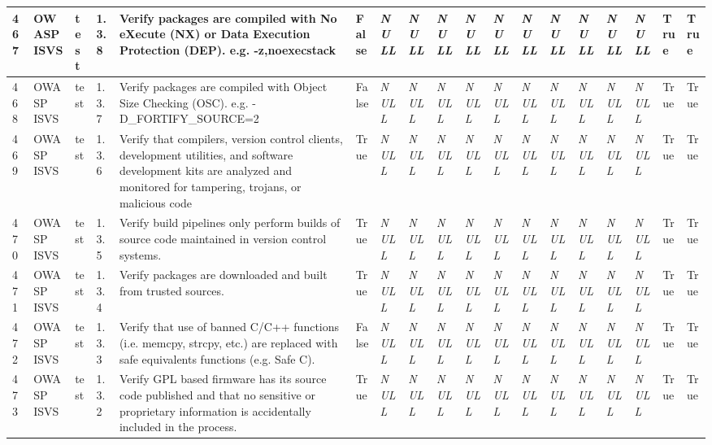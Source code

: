 \begin{longtable}{|l|l|l|l|l|l|l|l|l|l|l|l|l|l|l|l|l|l|}
467 & OWASP ISVS & test & 1.3.8 & Verify packages are compiled with No eXecute (NX) or Data Execution Protection (DEP). e.g. -z,noexecstack & False & \textit{NULL} & \textit{NULL} & \textit{NULL} & \textit{NULL} & \textit{NULL} & \textit{NULL} & \textit{NULL} & \textit{NULL} & \textit{NULL} & \textit{NULL} & True & True \\ \hline 
468 & OWASP ISVS & test & 1.3.7 & Verify packages are compiled with Object Size Checking (OSC). e.g. -D\_FORTIFY\_SOURCE=2 & False & \textit{NULL} & \textit{NULL} & \textit{NULL} & \textit{NULL} & \textit{NULL} & \textit{NULL} & \textit{NULL} & \textit{NULL} & \textit{NULL} & \textit{NULL} & True & True \\ \hline 
469 & OWASP ISVS & test & 1.3.6 & Verify that compilers, version control clients, development utilities, and software development kits are analyzed and monitored for tampering, trojans, or malicious code & True & \textit{NULL} & \textit{NULL} & \textit{NULL} & \textit{NULL} & \textit{NULL} & \textit{NULL} & \textit{NULL} & \textit{NULL} & \textit{NULL} & \textit{NULL} & True & True \\ \hline 
470 & OWASP ISVS & test & 1.3.5 & Verify build pipelines only perform builds of source code maintained in version control systems. & True & \textit{NULL} & \textit{NULL} & \textit{NULL} & \textit{NULL} & \textit{NULL} & \textit{NULL} & \textit{NULL} & \textit{NULL} & \textit{NULL} & \textit{NULL} & True & True \\ \hline 
471 & OWASP ISVS & test & 1.3.4 & Verify packages are downloaded and built from trusted sources. & True & \textit{NULL} & \textit{NULL} & \textit{NULL} & \textit{NULL} & \textit{NULL} & \textit{NULL} & \textit{NULL} & \textit{NULL} & \textit{NULL} & \textit{NULL} & True & True \\ \hline 
472 & OWASP ISVS & test & 1.3.3 & Verify that use of banned C/C++ functions (i.e. memcpy, strcpy, etc.) are replaced with safe equivalents functions (e.g. Safe C). & False & \textit{NULL} & \textit{NULL} & \textit{NULL} & \textit{NULL} & \textit{NULL} & \textit{NULL} & \textit{NULL} & \textit{NULL} & \textit{NULL} & \textit{NULL} & True & True \\ \hline 
473 & OWASP ISVS & test & 1.3.2 & Verify GPL based firmware has its source code published and that no sensitive or proprietary information is accidentally included in the process. & True & \textit{NULL} & \textit{NULL} & \textit{NULL} & \textit{NULL} & \textit{NULL} & \textit{NULL} & \textit{NULL} & \textit{NULL} & \textit{NULL} & \textit{NULL} & True & True \\ \hline 

\end{longtable}
